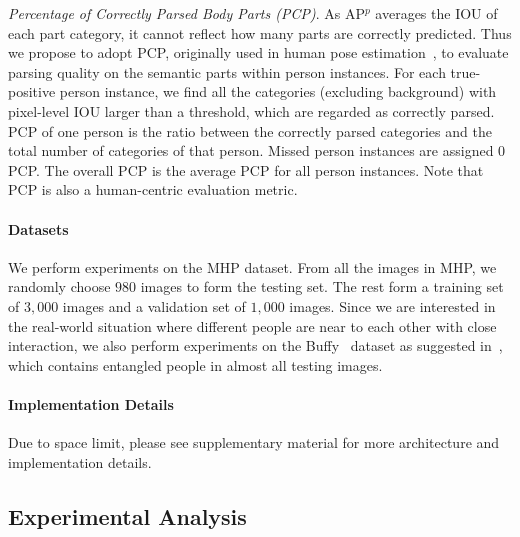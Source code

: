 \documentclass[10pt, letterpaper]{article}
\begin{document}
\emph{Percentage of Correctly Parsed Body Parts (PCP)}. As AP$^p$ averages the IOU of each part category, it cannot reflect how many parts are correctly predicted. Thus we propose to adopt PCP, originally used in human pose estimation~\cite{ferrari2008progressive,chen2014detect}, to evaluate parsing quality on the semantic parts within person instances. For each true-positive person instance, we find all the categories (excluding background) with pixel-level IOU larger than a threshold, which are regarded as correctly parsed. PCP of one person is the ratio between the correctly parsed categories and the total number of categories of that person. Missed person instances are assigned $0$ PCP. The overall PCP is the average PCP for all person instances. Note that PCP is also a human-centric evaluation metric. 

\paragraph{Datasets}
We perform experiments on the MHP dataset. From all the images in MHP,  we randomly choose $980$ images to form the testing set. The rest form a training set of $3{,}000$ images and a validation set of $1{,}000$ images. Since we are interested in the real-world situation where different people are near to each other with close interaction, we also perform experiments on the Buffy~\cite{vineet2011human} dataset as suggested in~\cite{jiang2017detangling}, which contains entangled people in almost all testing images.  

\paragraph{Implementation Details}
Due to space limit, please see supplementary material for more architecture and  implementation details.

\subsection{Experimental Analysis}
\end{document}
